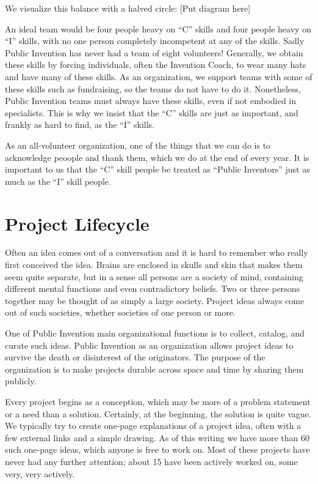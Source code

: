 \documentclass[
	fontsize=10pt, %
	twoside=false, %
	secnumdepth=1, %
]{kaobook}
\begin{document}
We visualize this balance with a halved circle:
[Put diagram here]

An ideal team would be four people heavy on ``C'' skills and four
people heavy on ``I'' skills, with no one person completely
incompetent at any of the skills. Sadly Public Invention has
never had a team of eight volunteers! Generally, we obtain
these skills by forcing individuals, often the Invention Coach,
to wear many hats and have many of these skills.
As an organization, we support teams with some of these
skills such as fundraising, so the teams do not have to do it.
Nonetheless, Public Invention teams must always have these
skills, even if not embodied in specialists. This
is why we insist that the ``C'' skills are just as important,
and frankly as hard to find, as the ``I'' skills.

As an all-volunteer organization, one of the things that
we can do is to acknowledge peoople and thank them, which
we do at the end of every year. It is important to us that
the ``C'' skill people be treated as ``Public Inventors'' just as
much as the ``I'' skill people.

\chapter{Project Lifecycle}

Often an idea comes out of a conversation and it is hard to remember who
really first conceived the idea. Brains are enclosed in skulls and skin that
makes them seem quite separate, but in a sense all persons are
a society of mind, containing different mental functions and even
contradictory beliefs. Two or three persons together may be
thought of as simply a large society.
Project ideas always come out of such societies, whether
societies of one person or more.

One of Public Invention main organizational functions is to
collect, catalog, and curate such ideas.
Public Invention as an organization allows project ideas to survive
the death or disinterest of the originators.
The purpose of the organization is to make projects durable
across space and time by sharing them publicly.

Every project begins as a conception, which may be more of a
problem statement or a need than a solution. Certainly, at the
beginning, the solution is quite vague.
We typically try to create one-page explanations of a project
idea, often with a few external links and a simple drawing.
As of this writing we have more than 60 such one-page ideas,
which anyone is free to work on. Most of these projects
have never had any further attention; about 15 have been actively
worked on, some very, very actively.
\end{document}

